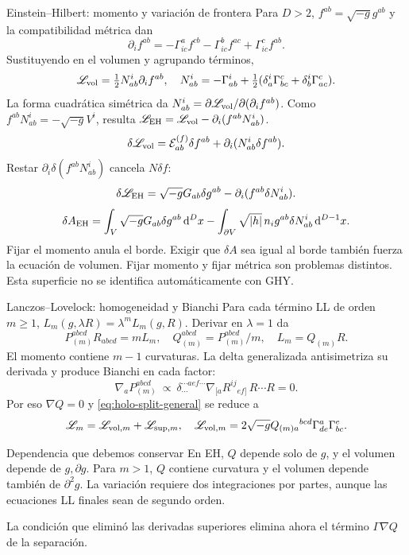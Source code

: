 \begin{frame}[label=holo-ll-05]{Einstein--Hilbert: momento y variación de frontera}
\footnotesize\CompactDisplaySpacing
Para $D>2$, $f^{ab}=\sqrt{-g}g^{ab}$ y la compatibilidad métrica dan
\[
\partial_i f^{ab}=-\Gamma^a_{ic}f^{cb}-\Gamma^b_{ic}f^{ac}+\Gamma^c_{ic}f^{ab}.
\]
Sustituyendo en el volumen y agrupando términos,
\begin{equation}
\mathscr L_{\rm vol}=\tfrac12N^i_{ab}\partial_i f^{ab},\quad
N^i_{ab}=-\Gamma^i_{ab}+\tfrac12(\delta_a^i\Gamma^c_{bc}+\delta_b^i\Gamma^c_{ac}).
\label{eq:holo-N}
\end{equation}
La forma cuadrática simétrica da $N^i_{ab}=\partial\mathscr L_{\rm vol}/\partial(\partial_i f^{ab})$.
Como $f^{ab}N^i_{ab}=-\sqrt{-g}V^i$, resulta
$\mathscr L_{\rm EH}=\mathscr L_{\rm vol}-\partial_i(f^{ab}N^i_{ab})$.
\[
\delta\mathscr L_{\rm vol}=\mathcal E^{(f)}_{ab}\delta f^{ab}+\partial_i(N^i_{ab}\delta f^{ab}).
\]
Restar $\partial_i\delta(f^{ab}N^i_{ab})$ cancela $N\delta f$:
\begin{equation}
\delta\mathscr L_{\rm EH}=\sqrt{-g}G_{ab}\delta g^{ab}-\partial_i(f^{ab}\delta N^i_{ab}).
\label{eq:holo-EH-boundary-variation}
\end{equation}
\[
\delta A_{\rm EH}=\int_V\sqrt{-g}G_{ab}\delta g^{ab}\,\mathrm{d}^Dx
-\int_{\partial V}\sqrt{|h|}\,n_i g^{ab}\delta N^i_{ab}\,\mathrm{d}^{D-1}x.
\]
Fijar el momento anula el borde. Exigir que $\delta A$ sea igual al borde también fuerza la ecuación de volumen. Fijar momento y fijar métrica son problemas distintos. Esta superficie no se identifica automáticamente con GHY.
\end{frame}
\begin{frame}[label=holo-ll-06]{Lanczos--Lovelock: homogeneidad y Bianchi}
\footnotesize\CompactDisplaySpacing
Para cada término LL de orden $m\ge1$, $L_m(g,\lambda R)=\lambda^mL_m(g,R)$.
Derivar en $\lambda=1$ da
\begin{equation}
P_{(m)}^{abcd}R_{abcd}=mL_m,\quad Q_{(m)}^{abcd}=P_{(m)}^{abcd}/m,\quad L_m=Q_{(m)}R.
\label{eq:holo-Q-P}
\end{equation}
El momento contiene $m-1$ curvaturas. La delta generalizada antisimetriza su derivada y produce Bianchi en cada factor:
\[
\nabla_aP_{(m)}^{abcd}\ \propto\
\delta^{\cdots aef\cdots}_{\cdots}\nabla_{[a}R^{ij}{}_{ef]}\,R\cdots R=0.
\]
Por eso $\nabla Q=0$ y \eqref{eq:holo-split-general} se reduce a
\[
\mathscr L_m=\mathscr L_{{\rm vol},m}+\mathscr L_{{\rm sup},m},\quad
\mathscr L_{{\rm vol},m}=2\sqrt{-g}Q_{(m)a}{}^{bcd}\Gamma^a_{de}\Gamma^e_{bc}.
\]
\begin{block}{Dependencia que debemos conservar}
En EH, $Q$ depende solo de $g$, y el volumen depende de $g,\partial g$.
Para $m>1$, $Q$ contiene curvatura y el volumen depende también de $\partial^2g$.
La variación requiere dos integraciones por partes, aunque las ecuaciones LL finales sean de segundo orden.
\end{block}
La condición que eliminó las derivadas superiores elimina ahora el término $\Gamma\nabla Q$ de la separación.
\end{frame}

